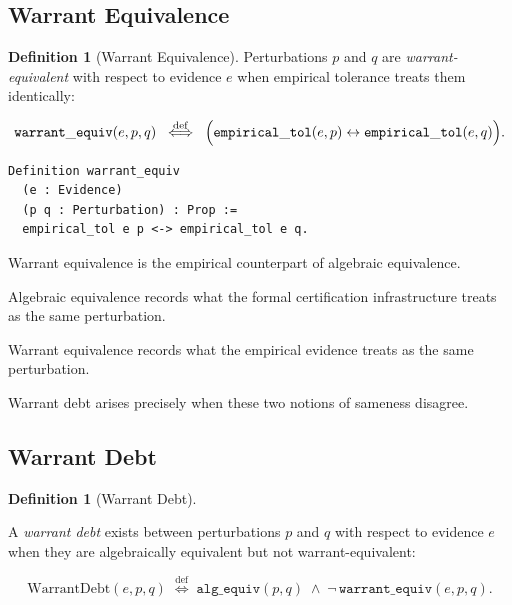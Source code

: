 \documentclass[12pt]{article}
\theoremstyle{plain}
\theoremstyle{definition}
\newtheorem{definition}[theorem]{Definition}
\theoremstyle{remark}
\newcommand{\WD}{\mathrm{WarrantDebt}}
\begin{document}
\subsection{Warrant Equivalence}

\begin{definition}[Warrant Equivalence]

Perturbations $p$ and $q$ are \emph{warrant-equivalent} with respect
to evidence $e$ when empirical tolerance treats them identically:

\[
\mathtt{warrant\_equiv}(e,p,q)
\;\stackrel{\mathrm{def}}{\iff}\;
\Bigl(
\mathtt{empirical\_tol}(e,p)
\leftrightarrow
\mathtt{empirical\_tol}(e,q)
\Bigr).
\]

\end{definition}

\begin{lstlisting}[style=rocq,
caption={Warrant equivalence.}]
Definition warrant_equiv
  (e : Evidence)
  (p q : Perturbation) : Prop :=
  empirical_tol e p <-> empirical_tol e q.
\end{lstlisting}

Warrant equivalence is the empirical counterpart of algebraic
equivalence.

Algebraic equivalence records what the formal certification
infrastructure treats as the same perturbation.

Warrant equivalence records what the empirical evidence treats as the
same perturbation.

Warrant debt arises precisely when these two notions of sameness
disagree.

\subsection{Warrant Debt}

\begin{definition}[Warrant Debt]
\label{def:warrant-debt}

A \emph{warrant debt} exists between perturbations $p$ and $q$ with
respect to evidence $e$ when they are algebraically equivalent but not
warrant-equivalent:

\[
\WD(e,p,q)
\;\stackrel{\mathrm{def}}{\iff}\;
\mathtt{alg\_equiv}(p,q)
\;\wedge\;
\neg\,\mathtt{warrant\_equiv}(e,p,q).
\]

\end{definition}
\end{document}
